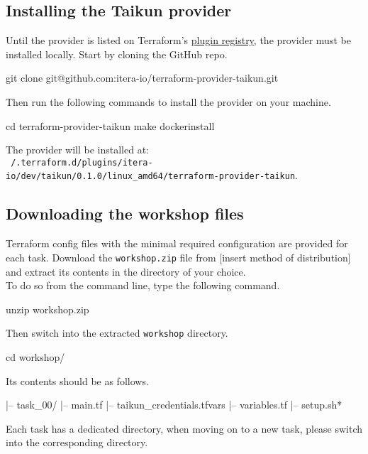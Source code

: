 \subsection{Installing the Taikun provider}
Until the provider is listed on Terraform's \href{https://registry.terraform.io/browse/providers}{plugin registry}, the provider must be installed locally.
Start by cloning the GitHub repo.
\begin{shell}
git clone git@github.com:itera-io/terraform-provider-taikun.git
\end{shell}
Then run the following commands to install the provider on your machine.
\begin{shell}
cd terraform-provider-taikun
make dockerinstall
\end{shell}
The provider will be installed at:\\
\texttt{~/.terraform.d/plugins/itera-io/dev/taikun/0.1.0/linux\_amd64/terraform-provider-taikun}.

\subsection{Downloading the workshop files}
Terraform config files with the minimal required configuration are provided for each task.
Download the \texttt{workshop.zip} file from [insert method of distribution] %
and extract its contents in the directory of your choice.\\

To do so from the command line, type the following command.
\begin{shell}
unzip workshop.zip
\end{shell}

Then switch into the extracted \texttt{workshop} directory.
\begin{shell}
cd workshop/
\end{shell}
Its contents should be as follows.
\begin{raw}
|-- task_00/
    |-- main.tf
    |-- taikun_credentials.tfvars
    |-- variables.tf
|-- setup.sh*
\end{raw}
Each task has a dedicated directory, when moving on to a new task, please switch into the corresponding directory.

